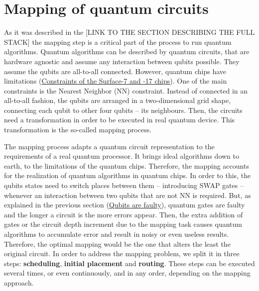 \section*{Mapping of quantum circuits}
\label{sec:org1f5e246}
As it was described in the [LINK TO THE SECTION DESCRIBING THE FULL STACK] the mapping step is a critical part of the process to run quantum algorithms.
Quantum algorithms can be described by quantum circuits, that are hardware agnostic and assume any interaction between qubits possible.
They assume the qubits are all-to-all connected.
However, quantum chips have limitations (\href{chapter-3.org}{Constraints of the Surface-7 and -17 chips}).
One of the main constraints is the Nearest Neighbor (NN) constraint.
Instead of connected in an all-to-all fashion, the qubits are arranged in a two-dimensional grid shape, connecting each qubit to other four qubits -- its neighbours.
Then, the circuits need a transformation in order to be executed in real quantum device.
This transformation is the so-called mapping process.

The mapping process adapts a quantum circuit representation to the requirements of a real quantum processor.
It brings ideal algorithms down to earth, to the limitations of the quantum chips.
Therefore, the mapping accounts for the realization of quantum algorithms in quantum chips.
In order to this, the qubits states need to switch places between them -- introducing SWAP gates -- whenever an interaction between two qubits that are not NN is required. 
But, as explained in the previous section (\hyperref[sec:org50236b4]{Qubits are faulty}), quantum gates are faulty and the longer a circuit is the more errors appear.
Then, the extra addition of gates or the circuit depth increment due to the mapping task causes quantum algorithms to accumulate error and result in noisy or even useless results.
Therefore, the optimal mapping would be the one that alters the least the original circuit.
In order to address the mapping problem, we split it in three steps: \textbf{scheduling}, \textbf{initial placement} and \textbf{routing}.
These steps can be executed several times, or even continuously, and in any order, depending on the mapping approach.

